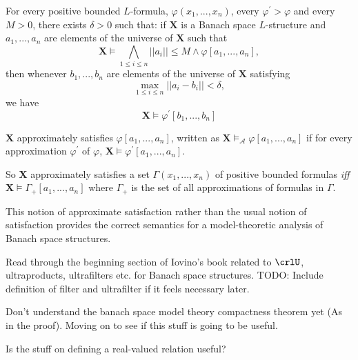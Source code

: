\begin{lemma}
    For every positive bounded $L$-formula, $\varphi(x_1,...,x_n)$, 
    every $\varphi^{'}>\varphi$ and every $M > 0$, there exists $\delta > 0$ such that:
    if $\mathbf{X}$ is a Banach space $L$-structure and $a_1,...,a_n$ are elements of the universe of $\mathbf{X}$ such that
    \begin{equation*}
        \mathbf{X}\models \bigwedge_{1\leq i\leq n} ||a_i||\leq M \wedge \varphi[a_1,...,a_n],
    \end{equation*}
    then whenever $b_1,...,b_n$ are elements of the universe of $\mathbf{X}$ satisfying
    \begin{equation*}
        \max_{1\leq i\leq n} ||a_i - b_i|| < \delta,
    \end{equation*}
    we have
    \begin{equation*}
        \mathbf{X}\models\varphi^{'}[b_1,...,b_n]
    \end{equation*}
\end{lemma}

\begin{definition}
    $\mathbf{X}$ approximately satisfies $\varphi[a_1,...,a_n]$, written as $\mathbf{X}\models_{\mathcal{A}}\varphi[a_1,...,a_n]$ if for every approximation $\varphi^{'}$ of $\varphi$, $\mathbf{X}\models\varphi^{'}[a_1,...,a_n]$.
\end{definition}

So $\mathbf{X}$ approximately satisfies a set $\Gamma(x_1,...,x_n)$ of positive bounded formulas \textit{iff} $\mathbf{X}\models\Gamma_{+}[a_1,...,a_n]$ where $\Gamma_{+}$ is the set of all approximations of formulas in $\Gamma$.
\begin{remark}
    This notion of approximate satisfaction rather than the usual notion of satisfaction provides the correct semantics for a model-theoretic analysis of Banach space structures.
\end{remark}

Read through the beginning section of Iovino's book related to $\crlU$, ultraproducts, ultrafilters etc. for Banach space structures.
TODO: Include definition of filter and ultrafilter if it feels necessary later.

Don't understand the banach space model theory compactness theorem yet (As in the proof). Moving on to see if this stuff is going to be useful.

Is the stuff on defining a real-valued relation useful?